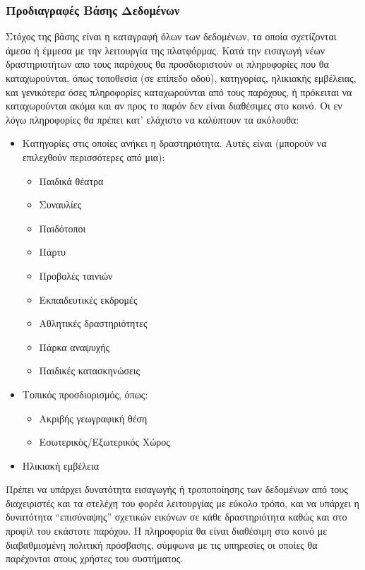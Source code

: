 \documentclass[letterpaper,6pt]{article}
\begin{document}
\subsubsection{Προδιαγραφές Βάσης Δεδομένων}
Στόχος της βάσης είναι η καταγραφή όλων των δεδομένων, τα οποία σχετίζονται άμεσα ή έμμεσα με την λειτουργία της πλατφόρμας.
Κατά την εισαγωγή νέων δραστηριοτήτων απο τους παρόχους θα προσδιοριστούν οι πληροφορίες που θα καταχωρούνται, όπως τοποθεσία (σε επίπεδο οδού), κατηγορίας, ηλικιακής εμβέλειας, και γενικότερα όσες πληροφορίες καταχωρούνται από τους παρόχους, ή πρόκειται να καταχωρούνται ακόμα και αν προς το παρόν δεν είναι διαθέσιμες στο κοινό. Οι εν λόγω πληροφορίες θα πρέπει κατ’ ελάχιστο να καλύπτουν τα ακόλουθα:
\begin{itemize}
  \item Κατηγορίες στις οποίες ανήκει η δραστηριότητα. Αυτές είναι (μπορούν να επιλεχθούν περισσότερες από μια):
    \begin{itemize}
      \item Παιδικά θέατρα
         \item Συναυλίες
         \item Παιδότοποι
         \item Πάρτυ
         \item Προβολές ταινιών
         \item Εκπαιδευτικές εκδρομές
         \item Αθλητικές δραστηριότητες
         \item Πάρκα αναψυχής
         \item Παιδικές κατασκηνώσεις
    \end{itemize}
    \item Τοπικός προσδιορισμός, όπως:
      \begin{itemize}
        \item Ακριβής γεωγραφική θέση
        \item Εσωτερικός/Εξωτερικός Χώρος
      \end{itemize}
    \item Ηλικιακή εμβέλεια
\end{itemize}
   Πρέπει να υπάρχει δυνατότητα εισαγωγής ή τροποποίησης των δεδομένων από τους διαχειριστές και τα στελέχη του φορέα λειτουργίας με εύκολο τρόπο, και να υπάρχει η δυνατότητα “επισύναψης” σχετικών εικόνων σε κάθε δραστηριότητα καθώς και στο προφίλ του εκάστοτε παρόχου. Η πληροφορία θα είναι διαθέσιμη στο κοινό με διαβαθμισμένη πολιτική πρόσβασης, σύμφωνα με τις υπηρεσίες οι οποίες θα παρέχονται στους χρήστες του συστήματος.
\end{document}
